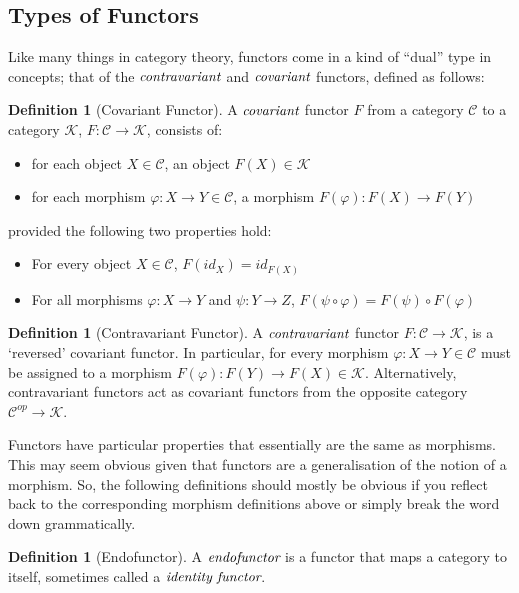 \documentclass[10pt, oneside, reqno]{amsart}
\theoremstyle{plain}%
\theoremstyle{definition}
\newtheorem{defn}[thm]{Definition}
\theoremstyle{remark}
\newcommand{\Id}{\mathit{id}_}
\begin{document}
\subsection{Types of Functors} %
\label{subsec:functorstypes}
Like many things in category theory, functors come in a kind of ``dual'' type in concepts;
that of the $\emph{contravariant}$ and $\emph{covariant}$ functors, defined as follows:

\begin{defn}[Covariant Functor]
 A $\emph{covariant}$ functor $F$ from a category $\mathcal{C}$ to a category $\mathcal{K}$, $F: \mathcal{C} \to \mathcal{K}$, consists of:
 \begin{itemize}
  \item for each object $X \in \mathcal{C}$, an object $F(X) \in \mathcal{K}$
  \item for each morphism $\varphi: X \to Y \in \mathcal{C}$, a morphism $F(\varphi): F(X) \to F(Y)$
 \end{itemize}
 provided the following two properties hold:
 \begin{itemize}
  \item For every object $X \in \mathcal{C}$, $F(\Id{X}) = \Id{F(X)}$
  \item For all morphisms $\varphi: X \to Y$ and $\psi: Y \to Z$, $F(\psi \circ \varphi) = F(\psi) \circ F(\varphi)$
 \end{itemize}
\end{defn}

\begin{defn}[Contravariant Functor]
 A $\emph{contravariant}$ functor $F: \mathcal{C} \to \mathcal{K}$, is a `reversed' covariant functor.
 In particular, for every morphism $\varphi: X \to Y \in \mathcal{C}$ must be assigned to a morphism $F(\varphi): F(Y) \to F(X) \in \mathcal{K}$.
 Alternatively, contravariant functors act as covariant functors from the opposite category $\mathcal{C}^{op} \to \mathcal{K}$.
\end{defn}

Functors have particular properties that essentially are the same as morphisms.
This may seem obvious given that functors are a generalisation of the notion of a morphism.
So, the following definitions should mostly be obvious if you reflect back to the corresponding morphism
definitions above or simply break the word down grammatically.

\begin{defn}[Endofunctor]
 A $\emph{endofunctor}$ is a functor that maps a category to itself, sometimes called a $\emph{identity functor}$.
\end{defn}
\end{document}
